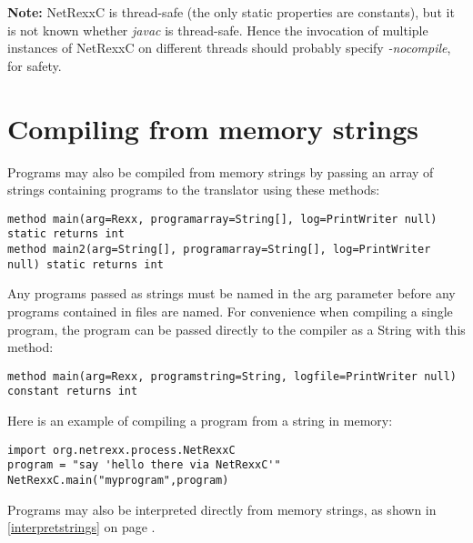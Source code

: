 {\textbf{Note:} NetRexxC is thread-safe (the only static properties are constants), but
it is not known whether \emph{javac} is thread-safe.  Hence the
invocation of multiple instances of NetRexxC on different threads should
probably specify \emph{-nocompile}, for safety.

\section{Compiling from memory strings}
Programs may also be compiled from memory strings by passing an array
of strings containing programs to the translator using these methods:

\begin{lstlisting}[label=frommemory,caption=From Memory]
method main(arg=Rexx, programarray=String[], log=PrintWriter null) static returns int
method main2(arg=String[], programarray=String[], log=PrintWriter null) static returns int
\end{lstlisting}

Any programs passed as strings must be named in the arg parameter before any programs contained in files are named.
For convenience when compiling a single program, the program can be
passed directly to the compiler as a String with this method:

\begin{lstlisting}[label=string,caption=With String argument]
method main(arg=Rexx, programstring=String, logfile=PrintWriter null) constant returns int
\end{lstlisting}

Here is an example of compiling a \nr{}program from a string in
memory:

\begin{lstlisting}[label=memexample,caption=Example of compiling from String]
import org.netrexx.process.NetRexxC
program = "say 'hello there via NetRexxC'"
NetRexxC.main("myprogram",program)
\end{lstlisting}

}Programs may also be interpreted directly from memory strings, as
shown in \ref{interpretstrings} on page \pageref{interpretstrings}.

